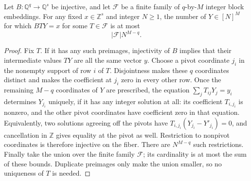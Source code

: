 \begin{lemma}
\label{qr:multiplicity}
\leanok
{}
Let $B:\mathbb Q^q\to\mathbb Q^s$ be injective, and let
$\mathcal F$ be a finite family of $q$-by-$M$ integer block embeddings.
For any fixed $x\in\mathbb Z^s$ and integer $N\geq1$, the number of
$Y\in[N]^M$ for which $BTY=x$ for some $T\in\mathcal F$ is at most
\[
 |\mathcal F|N^{M-q}.
\]
\end{lemma}
\begin{proof}
Fix $T$.  If it has any such preimages, injectivity of $B$ implies that
their intermediate values $TY$ are all the same vector $y$.
Choose a pivot coordinate $j_i$ in the nonempty support of row $i$ of
$T$.  Disjointness makes these $q$ coordinates distinct and makes the
coefficient at $j_i$ zero in every other row.
Once the remaining $M-q$ coordinates of $Y$ are prescribed, the equation
$\sum_jT_{ij}Y_j=y_i$ determines $Y_{j_i}$ uniquely, if it has any integer
solution at all: its coefficient $T_{i,j_i}$ is nonzero, and the other
pivot coordinates have coefficient zero in that equation.
Equivalently, two solutions agreeing off the pivots have
$T_{i,j_i}(Y_{j_i}-Y'_{j_i})=0$, and cancellation in $\mathbb Z$ gives
equality at the pivot as well.
Restriction to nonpivot coordinates is therefore injective on the fiber.
There are $N^{M-q}$ such restrictions.
Finally take the union over the finite family $\mathcal F$; its cardinality
is at most the sum of these bounds.  Duplicate preimages only make the
union smaller, so no uniqueness of $T$ is needed.
\end{proof}

